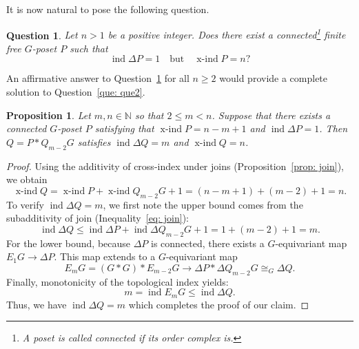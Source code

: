 \documentclass[preprint,12pt]{article}
\renewcommand{\le}{\leqslant}
\renewcommand{\ge}{\geqslant}
\newtheorem{proposition}[theorem]{Proposition}
\newtheorem{question}[theorem]{Question}
\theoremstyle{definition}
\theoremstyle{remark}
\numberwithin{equation}{section}
\DeclareMathOperator{\ind}{ind}
\DeclareMathOperator{\xind}{x-ind}
\begin{document}
It is now natural to pose the following question.

\begin{question}
\label{que: que3}
Let \( n > 1 \) be a positive integer. Does there exist a connected\footnote{A poset is called connected if its order complex is.} finite free \( G \)-poset \( P \) such that
\[
\ind \Delta P = 1 \quad \text{but} \quad \xind P = n?
\]
\end{question}

An affirmative answer to Question~\ref{que: que3} for all $n \ge 2$ would provide a complete solution to Question~\ref{que: que2}.
\begin{proposition}
    Let $m,n\in \mathbb N$ so that $2 \le m < n$. Suppose that there exists a connected $G$-poset $P$ satisfying that $\xind P = n - m + 1$ and $\ind\Delta P = 1$. Then $Q = P * Q_{m-2}G$ satisfies $\ind\Delta Q = m$ and $\xind Q = n$.
\end{proposition}
\begin{proof}
 Using the additivity of cross-index under joins (Proposition~\ref{prop: join}), we obtain
    \[
    \xind Q = \xind P + \xind Q_{m-2}G + 1 = (n - m + 1) + (m - 2) + 1 = n.
    \]
    To verify $\ind \Delta Q = m$, we first note the upper bound comes from the subadditivity of join (Inequality~\ref{eq: join}):
    \[
    \ind \Delta Q \le \ind \Delta P + \ind \Delta Q_{m-2}G + 1 = 1 + (m - 2) + 1 = m.
    \]
For the lower bound, because $\Delta P$ is connected, there exists a $G$-equivariant map $E_1G \to \Delta P$. This map extends to a $G$-equivariant map
$$E_mG = (G \ast G) \ast E_{m-2}G \longrightarrow \Delta P \ast \Delta Q_{m-2}G \cong_{G} \Delta Q.$$
Finally, monotonicity of the topological index yields:
    \[
    m = \ind E_mG \le \ind \Delta Q.
    \]
Thus, we have $\ind \Delta Q = m$ which completes the proof of our claim.
\end{proof}
\end{document}
